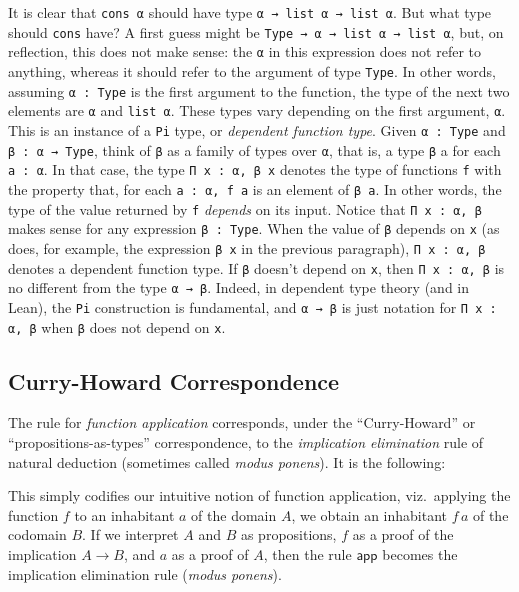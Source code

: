 \documentclass[12pt]{amsart}  %
\begin{document}
It is clear that \lstinline{cons α} should have type \lstinline{α → list α → list α}. But what type should \lstinline{cons} have? A first guess might be \lstinline{Type → α → list α → list α}, but, on reflection, this does not make sense: the \lstinline{α} in this expression does not refer to anything, whereas it should refer to the argument of type \lstinline{Type}. In other words, assuming \lstinline{α : Type} is the first argument to the function, the type of the next two elements are \lstinline{α} and \lstinline{list α}. These types vary depending on the first argument, \lstinline{α}. This is an instance of a \lstinline{Pi} type, or \emph{dependent function type}. Given \lstinline{α : Type} and \lstinline{β : α → Type},
think of \lstinline{β} as a family of types over \lstinline{α}, that is, a type \lstinline{β} a for each \lstinline{a : α}. In that case, the type \lstinline{Π x : α, β x} denotes the type of functions \lstinline{f} with the property that, for each \lstinline{a : α, f a} is an element of \lstinline{β a}. In other words, the type of the value returned by \lstinline{f} \emph{depends} on its input. Notice that \lstinline{Π x : α, β} makes sense for any expression \lstinline{β : Type}. When the value of \lstinline{β} depends on \lstinline{x} (as does, for example, the expression \lstinline{β x} in the previous paragraph), \lstinline{Π x : α, β} denotes a dependent function type. If \lstinline{β} doesn't depend on \lstinline{x}, then \lstinline{Π x : α, β} is no different from the type \lstinline{α → β}. Indeed, in dependent type theory (and in Lean), the \lstinline{Pi} construction is fundamental, and \lstinline{α → β} is just notation for \lstinline{Π x : α, β} when \lstinline{β} does not depend on \lstinline{x}.

\subsection{Curry-Howard Correspondence}
The rule for \emph{function application} corresponds, under the 
``Curry-Howard'' or ``propositions-as-types'' correspondence, to the \emph{implication elimination} rule of 
natural deduction (sometimes called \emph{modus ponens}).  It is the following:
\begin{prooftree}
\end{prooftree}
This simply codifies our intuitive notion of function application, viz.~applying the 
function $f$ to an inhabitant $a$ of the domain $A$, we obtain an inhabitant $f \, a$
of the codomain $B$.  If we interpret $A$ and $B$ as propositions,
$f$ as a proof of the implication $A \to B$, and  
$a$ as a proof of $A$, then the rule $\mathsf{app}$ becomes the implication elimination rule (\emph{modus ponens}).
% 
\end{document}
